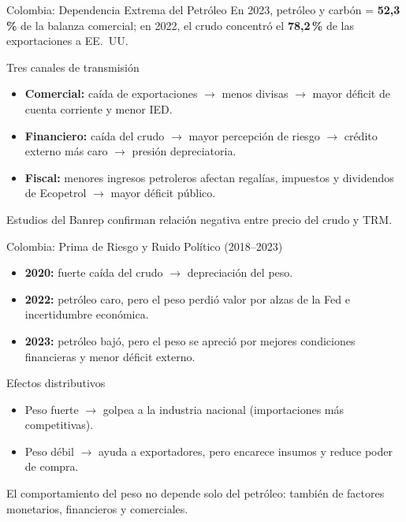 \documentclass[10pt,professionalfonts,aspectratio=169]{beamer}
\begin{document}
\begin{frame}{Colombia: Dependencia Extrema del Petróleo}
    En 2023, petróleo y carbón = \textbf{52{,}3\,\%} de la balanza comercial; en 2022, el crudo concentró el \textbf{78{,}2\,\%} de las exportaciones a EE.~UU.

    \begin{block}{Tres canales de transmisión}
        \begin{itemize}
            \item \textbf{Comercial:} caída de exportaciones $\to$ menos divisas $\to$ mayor déficit de cuenta corriente y menor IED.
            \item \textbf{Financiero:} caída del crudo $\to$ mayor percepción de riesgo $\to$ crédito externo más caro $\to$ presión depreciatoria.
            \item \textbf{Fiscal:} menores ingresos petroleros afectan regalías, impuestos y dividendos de Ecopetrol $\to$ mayor déficit público.
        \end{itemize}
    \end{block}

    \footnotesize Estudios del Banrep confirman relación negativa entre precio del crudo y TRM.
\end{frame}

\begin{frame}{Colombia: Prima de Riesgo y Ruido Político (2018--2023)}
    \begin{itemize}
        \item \textbf{2020:} fuerte caída del crudo $\to$ depreciación del peso.
        \item \textbf{2022:} petróleo caro, pero el peso perdió valor por alzas de la Fed e incertidumbre económica.
        \item \textbf{2023:} petróleo bajó, pero el peso se apreció por mejores condiciones financieras y menor déficit externo.
    \end{itemize}

    \vspace{0.2cm}
    \begin{block}{Efectos distributivos}
        \begin{itemize}
            \item Peso fuerte $\to$ golpea a la industria nacional (importaciones más competitivas).
            \item Peso débil $\to$ ayuda a exportadores, pero encarece insumos y reduce poder de compra.
        \end{itemize}
    \end{block}

    \footnotesize El comportamiento del peso no depende solo del petróleo: también de factores monetarios, financieros y comerciales.
\end{frame}
\end{document}
